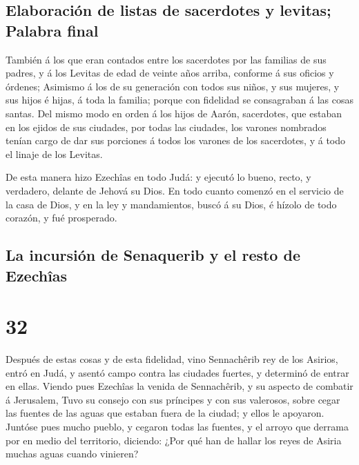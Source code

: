 \hypertarget{elaboraciuxf3n-de-listas-de-sacerdotes-y-levitas-palabra-final}{%
\subsection{Elaboración de listas de sacerdotes y levitas; Palabra
final}\label{elaboraciuxf3n-de-listas-de-sacerdotes-y-levitas-palabra-final}}

 También á los que eran contados entre los sacerdotes por
las familias de sus padres, y á los Levitas de edad de veinte años
arriba, conforme á sus oficios y órdenes;  Asimismo á los
de su generación con todos sus niños, y sus mujeres, y sus hijos é
hijas, á toda la familia; porque con fidelidad se consagraban á las
cosas santas.  Del mismo modo en orden á los hijos de
Aarón, sacerdotes, que estaban en los ejidos de sus ciudades, por todas
las ciudades, los varones nombrados tenían cargo de dar sus porciones á
todos los varones de los sacerdotes, y á todo el linaje de los Levitas.

 De esta manera hizo Ezechîas en todo Judá: y ejecutó lo
bueno, recto, y verdadero, delante de Jehová su Dios.  En
todo cuanto comenzó en el servicio de la casa de Dios, y en la ley y
mandamientos, buscó á su Dios, é hízolo de todo corazón, y fué
prosperado.

\hypertarget{la-incursiuxf3n-de-senaquerib-y-el-resto-de-ezechuxeeas}{%
\subsection{La incursión de Senaquerib y el resto de
Ezechîas}\label{la-incursiuxf3n-de-senaquerib-y-el-resto-de-ezechuxeeas}}

\hypertarget{section-31}{%
\section{32}\label{section-31}}

 Después de estas cosas y de esta fidelidad, vino
Sennachêrib rey de los Asirios, entró en Judá, y asentó campo contra las
ciudades fuertes, y determinó de entrar en ellas.  Viendo
pues Ezechîas la venida de Sennachêrib, y su aspecto de combatir á
Jerusalem,  Tuvo su consejo con sus príncipes y con sus
valerosos, sobre cegar las fuentes de las aguas que estaban fuera de la
ciudad; y ellos le apoyaron.  Juntóse pues mucho pueblo, y
cegaron todas las fuentes, y el arroyo que derrama por en medio del
territorio, diciendo: ¿Por qué han de hallar los reyes de Asiria muchas
aguas cuando vinieren?

